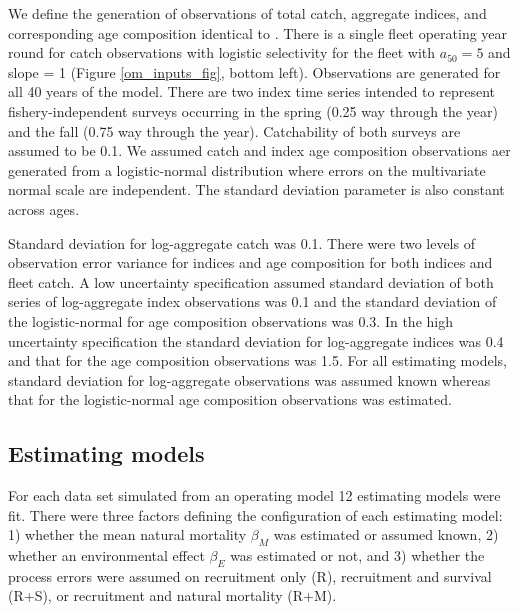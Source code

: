 \documentclass[
  12pt,
]{article}
\begin{document}
We define the generation of observations of total catch, aggregate indices, and corresponding age composition identical to \citet{milleretal_inreview1}. There is a single fleet operating year round for catch observations with logistic selectivity for the fleet with \(a_{50} = 5\) and slope = 1 (Figure \ref{om_inputs_fig}, bottom left). Observations are generated for all 40 years of the model. There are two index time series intended to represent fishery-independent surveys occurring in the spring (0.25 way through the year) and the fall (0.75 way through the year). Catchability of both surveys are assumed to be 0.1. We assumed catch and index age composition observations aer generated from a logistic-normal distribution where errors on the multivariate normal scale are independent. The standard deviation parameter is also constant across ages.

Standard deviation for log-aggregate catch was 0.1. There were two levels of observation error variance for indices and age composition for both indices and fleet catch. A low uncertainty specification assumed standard deviation of both series of log-aggregate index observations was 0.1 and the standard deviation of the logistic-normal for age composition observations was 0.3. In the high uncertainty specification the standard deviation for log-aggregate indices was 0.4 and that for the age composition observations was 1.5. For all estimating models, standard deviation for log-aggregate observations was assumed known whereas that for the logistic-normal age composition observations was estimated.

\hypertarget{estimating-models}{%
\subsection*{Estimating models}\label{estimating-models}}

For each data set simulated from an operating model 12 estimating models were fit. There were three factors defining the configuration of each estimating model: 1) whether the mean natural mortality \(\beta_M\) was estimated or assumed known, 2) whether an environmental effect \(\beta_E\) was estimated or not, and 3) whether the process errors were assumed on recruitment only (R), recruitment and survival (R+S), or recruitment and natural mortality (R+M).
\end{document}
